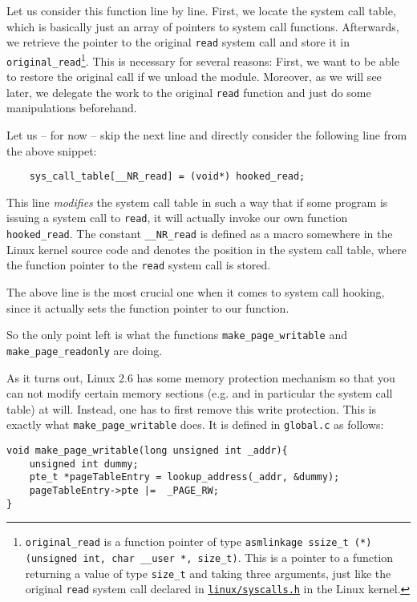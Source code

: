 \documentclass[10pt, letterpaper]{article}
\begin{document}
Let us consider this function line by line. First, we locate the system call table, which is basically just an array of pointers to system call functions. Afterwards, we retrieve the pointer to the original \texttt{read} system call and store it in  \texttt{original\_read}\footnote{\texttt{original\_read} is a function pointer of type \texttt{asmlinkage ssize\_t (*)(unsigned int, char \_\_user *, size\_t)}. This is a pointer to a function returning a value of type \texttt{size\_t} and taking three arguments, just like the original \texttt{read} system call declared in \href{http://lxr.linux.no/linux+v2.6.32/arch/x86/include/asm/syscalls.h}{\texttt{linux/syscalls.h}} in the Linux kernel.}. This is necessary for several reasons: First, we want to be able to restore the original call if we unload the module. Moreover, as we will see later, we delegate the work to the original \texttt{read} function and just do some manipulations beforehand.

Let us -- for now -- skip the next line and directly consider the following line from the above snippet:

\begin{verbatim}
    sys_call_table[__NR_read] = (void*) hooked_read;
\end{verbatim}

This line \emph{modifies} the system call table in such a way that if some program is issuing a system call to \texttt{read}, it will actually invoke our own function \texttt{hooked\_read}. The constant \texttt{\_\_NR\_read} is defined as a macro somewhere in the Linux kernel source code and denotes the position in the system call table, where the function pointer to the \texttt{read} system call is stored.

The above line is the most crucial one when it comes to system call hooking, since it actually sets the function pointer to our function.

So the only point left is what the functions \texttt{make\_page\_writable} and \texttt{make\_page\_readonly} are doing.

As it turns out, Linux 2.6 has some memory protection mechanism so that you can not modify certain memory sections (e.g. and in particular the system call table) at will. Instead, one has to first remove this write protection. This is exactly what \texttt{make\_page\_writable} does. It is defined in \texttt{global.c} as follows:

\begin{verbatim}
void make_page_writable(long unsigned int _addr){
    unsigned int dummy;
    pte_t *pageTableEntry = lookup_address(_addr, &dummy);
    pageTableEntry->pte |=  _PAGE_RW;
}
\end{verbatim}
\end{document}

